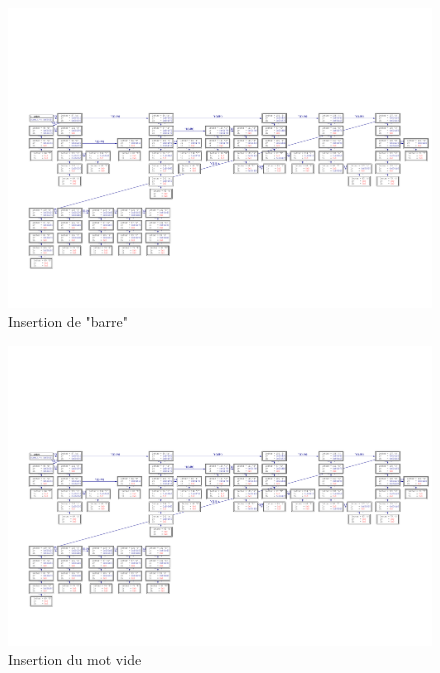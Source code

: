 	\begin{figure}[H]
		\centering \includegraphics[angle=90,scale=0.82,trim=1cm 0cm 0cm 5cm,clip=true]{../tests/ddd_insertion_barre}
		\caption{Insertion de "barre"}
	\end{figure}
	\begin{figure}[H]
		\centering \includegraphics[angle=90,scale=0.82,trim=1cm 0cm 0cm 5cm,clip=true]{../tests/ddd_insertion_mot_vide}
		\caption{Insertion du mot vide}
	\end{figure}
